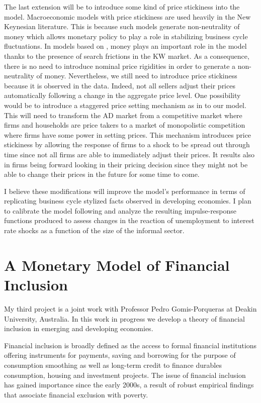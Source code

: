 \documentclass[12pt,a4paper,titlepage]{article}
\begin{document}
The last extension will be to introduce some kind of price stickiness into the model. Macroeconomic models with price stickiness are used heavily in the New Keynesian literature. This is because such models generate non-neutrality of money which allows monetary policy to play a role in stabilizing business cycle fluctuations. In models based on \cite{Lagos2005}, money plays an important role in the model thanks to the presence of search frictions in the KW market. As a consequence, there is no need to introduce nominal price rigidities in order to generate a non-neutrality of money. Nevertheless, we still need to introduce price stickiness because it is observed in the data. Indeed, not all sellers adjust their prices automatically following a change in the aggregate price level. One possibility would be to introduce a staggered price setting mechanism as in \cite{Calvo1983} to our model. This will need to transform the AD market from a competitive market where firms and households are price takers to a market of monopolistic competition where firms have some power in setting prices. This mechanism introduces price stickiness by allowing the response of firms to a shock to be spread out through time since not all firms are able to immediately adjust their prices. It results also in firms being forward looking in their pricing decision since they might not be able to change their prices in the future for some time to come.

I believe these modifications will improve the model's performance in terms of replicating business cycle stylized facts observed in developing economies. I plan to calibrate the model following \cite{Aruoba2011} and analyze the resulting impulse-response functions produced to assess changes in the reaction of unemployment to interest rate shocks as a function of the size of the informal sector.

\section{A Monetary Model of Financial Inclusion}

My third project is a joint work with Professor Pedro Gomis-Porqueras at Deakin University, Australia. In this work in progress we develop a theory of financial inclusion in emerging and developing economies.

Financial inclusion is broadly defined as the access to formal financial institutions offering instruments for payments, saving and borrowing for the purpose of consumption smoothing as well as long-term credit to finance durables consumption, housing and investment projects. The issue of financial inclusion has gained importance since the early 2000s, a result of robust empirical findings that associate financial exclusion with poverty.
\end{document}
